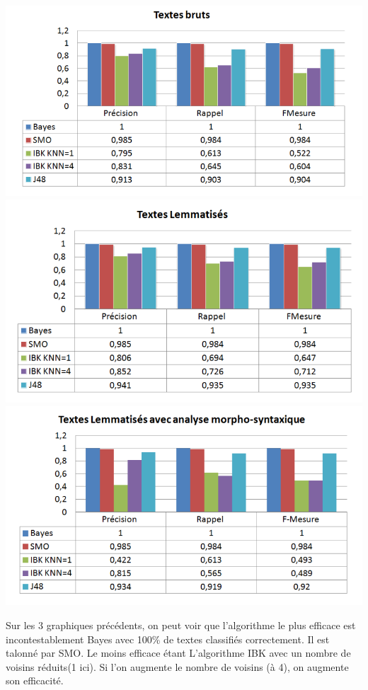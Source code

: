 \documentclass[a4paper,11pt]{article}
\begin{document}
\begin{center}
\includegraphics[scale=0.4]{comp1.png}\\
\includegraphics[scale=0.4]{comp2.png}\\
\includegraphics[scale=0.4]{comp3.png}
\end{center}

Sur les 3 graphiques précédents, on peut voir que l’algorithme le plus efficace est incontestablement Bayes avec 100\% de textes classifiés correctement. Il est talonné par SMO. Le moins efficace étant L’algorithme IBK avec un nombre de voisins réduits(1 ici). Si l’on augmente le nombre de voisins (à 4), on augmente son efficacité.
\end{document}
